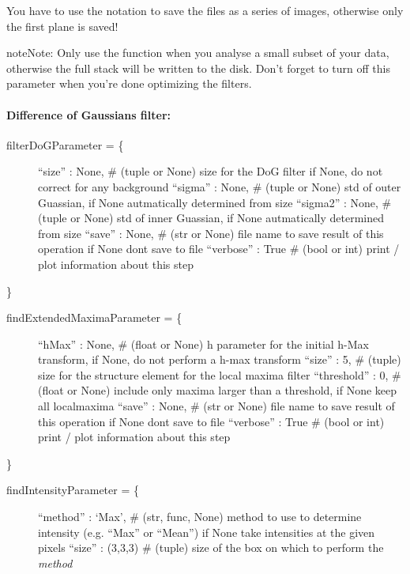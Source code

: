 \documentclass[letterpaper,10pt,english]{sphinxmanual}
\begin{document}
You have to use the  notation to save the files as a series of images, otherwise only the first plane is saved!

\begin{notice}{note}{Note:}
Only use the  function when you analyse a small subset of your data, otherwise the full stack will be written to the disk. Don’t forget to turn off this parameter when you’re done optimizing the filters.
\end{notice}


\paragraph{Difference of Gaussians filter:}
\label{tutorial:difference-of-gaussians-filter}\begin{description}
\item[{filterDoGParameter = \{}] \leavevmode
``size''    : None,        \# (tuple or None)      size for the DoG filter if None, do not correct for any background
``sigma''   : None,        \# (tuple or None)      std of outer Guassian, if None autmatically determined from size
``sigma2''  : None,        \# (tuple or None)      std of inner Guassian, if None autmatically determined from size
``save''    : None,        \# (str or None)        file name to save result of this operation if None dont save to file
``verbose'' : True      \# (bool or int)        print / plot information about this step

\end{description}

\}
\begin{description}
\item[{findExtendedMaximaParameter = \{}] \leavevmode
``hMax''      : None,            \# (float or None)     h parameter for the initial h-Max transform, if None, do not perform a h-max transform
``size''      : 5,             \# (tuple)             size for the structure element for the local maxima filter
``threshold'' : 0,        \# (float or None)     include only maxima larger than a threshold, if None keep all localmaxima
``save''      : None,         \# (str or None)       file name to save result of this operation if None dont save to file
``verbose''   : True       \# (bool or int)       print / plot information about this step

\end{description}

\}
\begin{description}
\item[{findIntensityParameter = \{}] \leavevmode
``method'' : `Max',       \# (str, func, None)   method to use to determine intensity (e.g. ``Max'' or ``Mean'') if None take intensities at the given pixels
``size''   : (3,3,3)       \# (tuple)             size of the box on which to perform the \emph{method}

\end{description}
\end{document}
